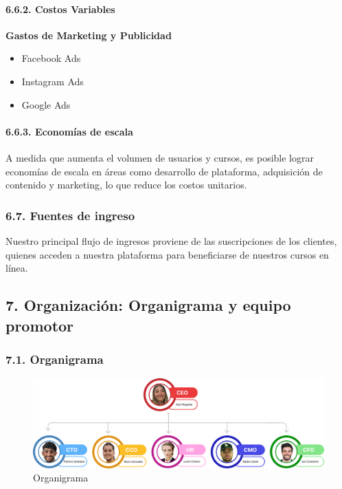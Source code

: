 \documentclass[
]{article}
\providecommand{\tightlist}{%
  \setlength{\itemsep}{0pt}\setlength{\parskip}{0pt}}
\begin{document}
\paragraph{6.6.2. Costos Variables}\label{costos-variables}

\textbf{Gastos de Marketing y Publicidad}

\begin{itemize}
\tightlist
\item
  Facebook Ads
\item
  Instagram Ads
\item
  Google Ads
\end{itemize}

\paragraph{6.6.3. Economías de escala}\label{economuxedas-de-escala}

A medida que aumenta el volumen de usuarios y cursos, es posible lograr
economías de escala en áreas como desarrollo de plataforma, adquisición
de contenido y marketing, lo que reduce los costos unitarios.

\subsubsection{6.7. Fuentes de ingreso}\label{fuentes-de-ingreso}

Nuestro principal flujo de ingresos proviene de las suscripciones de los
clientes, quienes acceden a nuestra plataforma para beneficiarse de
nuestros cursos en línea.

\newpage

\subsection{7. Organización: Organigrama y equipo
promotor}\label{organizaciuxf3n-organigrama-y-equipo-promotor}

\subsubsection{7.1. Organigrama}\label{organigrama}

\begin{figure}
\centering
\includegraphics[width=1\textwidth,height=\textheight]{img/Organigrama.png}
\caption{Organigrama}
\end{figure}
\end{document}

